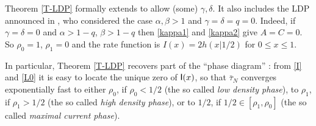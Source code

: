 \documentclass{amsart}
\theoremstyle{definition}
\theoremstyle{remark}
\theoremstyle{remark}
\theoremstyle{definition}
\numberwithin{equation}{section}
\begin{document}
  Theorem \ref{T-LDP} formally extends \cite[Section 3.5, formula (3.12)]{derrida2003exact}  to allow (some)  $\gamma,\delta$. It also includes
the LDP announced in \cite[formula (30)]{derrida2001free}, who considered the case $\alpha,\beta>1$ and $\gamma=\delta=q=0$.
Indeed, if $\gamma=\delta=0$ and $\alpha>1-q$, $\beta>1-q$ then \eqref{kappa1} and \eqref{kappa2} give $A=C=0$. So
 $\rho_0=1$, $\rho_1=0$ and the rate function is $I(x)=2h(x|1/2)$ for $0\leq x\leq 1$.

In particular, Theorem \ref{T-LDP} recovers   part of the ``phase diagram''  \cite{derrida1992exact,derrida1993exact,enaud2004large,schutz1993phase}:
from \eqref{I} and \eqref{L0} it is easy to locate the unique zero of ${\mbox{\fontfamily{phv}\selectfont I}}(x)$, so that $\bar\tau_N$ converges exponentially fast to
either $\rho_0$, if $\rho_0<1/2$ (the so called {\em low density phase}),
 to $\rho_1$, if $\rho_1>1/2$ (the so called {\em high density phase}), or to $1/2$, if $1/2\in [\rho_1,\rho_0]$
 (the so called {\em maximal current phase}).
\end{document}
